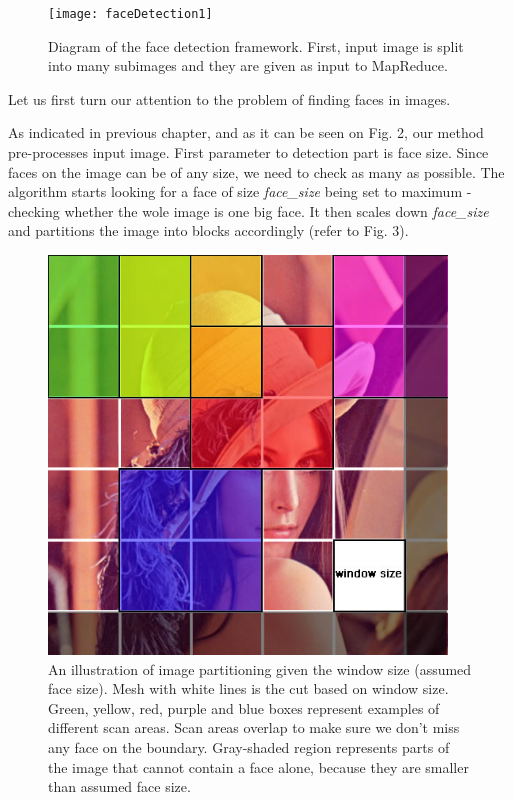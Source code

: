 \documentclass[11pt, draftclsnofoot, onecolumn]{IEEEtran}
\begin{document}
\begin{figure}
\centering
\texttt{[image: faceDetection1]}
\caption{Diagram of the face detection framework. First, input image is split into many subimages and they are given as input to MapReduce.}
\end{figure}

Let us first turn our attention to the problem of finding faces in images.

As indicated in previous chapter, and as it can be seen on Fig. 2, our method pre-processes input image. First parameter to detection part is face size. Since faces on the image can be of any size, we need to check as many as possible. The algorithm starts looking for a face of size \emph{face\_size} being set to maximum - checking whether the wole image is one big face. It then scales down \emph{face\_size} and partitions the image into blocks accordingly (refer to Fig. 3).

\begin{figure}[t!]
\centering
\includegraphics[width=300pt, height=300pt]{img1}
\caption{An illustration of image partitioning given the window size (assumed face size). Mesh with white lines is the cut based on window size. Green, yellow, red, purple and blue boxes represent examples of different scan areas. Scan areas overlap to make sure we don't miss any face on the boundary. Gray-shaded region represents parts of the image that cannot contain a face alone, because they are smaller than assumed face size.}
\end{figure}
\end{document}
